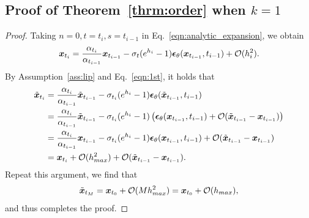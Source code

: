 \subsection{Proof of Theorem~\ref{thrm:order} when $k=1$}
\label{app:proof-k1}
\begin{proof}
Taking $n = 0, t = t_i, s = t_{i-1}$ in Eq.~\eqref{eqn:analytic_expansion}, we obtain
\begin{equation}
\label{eqn:analytic_expansion_n0}
    \bm{x}_{t_i} = \frac{\alpha_{t_i}}{\alpha_{t_{i-1}}}\bm{x}_{t_{i-1}} 
    - \sigma_t (e^{h_i} - 1)\bm{\epsilon}_\theta(\bm{x}_{t_{i-1}},{t_{i-1}})
    +\mathcal O(h_i^{2}).
\end{equation}
By Assumption~\ref{ass:lip} and Eq.~\eqref{eqn:1st}, it holds that
\[ \begin{aligned}
    \tilde{\bm{x}}_{t_i} 
    &= \frac{\alpha_{t_i}}{\alpha_{t_{i-1}}} \tilde{\bm{x}}_{t_{i-1}} - \sigma_{t_i} (e^{h_i} - 1)\bm{\epsilon}_\theta(\tilde{\bm{x}}_{t_{i-1}},t_{i-1}) \\
    &= \frac{\alpha_{t_i}}{\alpha_{t_{i-1}}} \tilde{\bm{x}}_{t_{i-1}} - \sigma_{t_i} (e^{h_i} - 1) \left ( \bm{\epsilon}_\theta(\bm{x}_{t_{i-1}},t_{i-1}) + \mathcal O(\tilde {\bm{x}}_{t_{i-1}} - \bm{x}_{t_{i-1}} ) \right ) \\
    &= \frac{\alpha_{t_i}}{\alpha_{t_{i-1}}} \bm{x}_{t_{i-1}} - \sigma_{t_i} (e^{h_i} - 1) \bm{\epsilon}_\theta(\bm{x}_{t_{i-1}},t_{i-1}) + \mathcal O(\tilde {\bm{x}}_{t_{i-1}} - \bm{x}_{t_{i-1}} )  \\
    &= \bm{x}_{t_i} + \mathcal O(h_{max}^2) + \mathcal O(\tilde {\bm{x}}_{t_{i-1}} - \bm{x}_{t_{i-1}} ).
\end{aligned} \]
Repeat this argument, we find that
\[ \tilde {\bm{x}}_{t_M} = \bm{x}_{t_0} + \mathcal O( M h_{max}^2 ) = \bm{x}_{t_0} + \mathcal O(h_{max}), \]
and thus completes the proof.
\end{proof}

